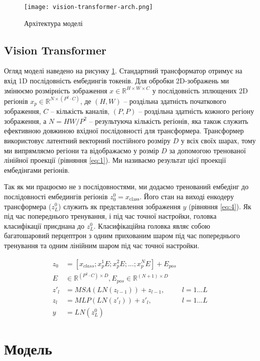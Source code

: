 \begin{figure}[H]
    \centering
    \texttt{[image: vision-transformer-arch.png]}
    \caption{Архітектура моделі}
    \label{fig:model-arch}
\end{figure}

\subsection{Vision Transformer}
Огляд моделі наведено на рисунку \ref{fig:model-arch}.
Стандартний трансформатор отримує на вхід 1D
послідовність ембедингів токенів.
Для обробки 2D-зображень ми змінюємо розмірність зображення
$x \in \mathbb{R}^{H\times W \times C}$ у послідовність
зплющених 2D регіонів $x_p \in \mathbb{R}^{N\times (P^2\cdot C)}$,
де $(H, W)$ -- роздільна здатність початкового
зображення, $C$ -- кількість каналів, $(P, P)$ -- роздільна
здатність кожного регіону зображення,
а $N = HW / P^2$ -- результуюча кількість регіонів,
яка також служить ефективною довжиною вхідної послідовності для
трансформера. Трансформер використовує
латентний векторний постійного розміру $D$ у всіх своїх шарах,
тому ми випрямляємо регіони та відображаємо у розмір $D$
за допомогою тренованої лінійної проекції (рівняння \ref{eq:1}).
Ми називаємо результат цієї проекції ембедінгами регіонів.

Так як ми працюємо не з послідовностями, ми додаємо
тренований ембедінг до послідовності ембедингів регіонів
$z_0^0 = x_{\text{class}}$. Його стан на виході енкодеру трансформера
($z_L^0$) служить як представлення зображення $y$ (рівняння \ref{eq:4}).
Як під час попереднього тренування, і під час точної настройки,
головка класифікації приєднана до  $z^0_L$.
Класифікаційна головка являє собою багатошаровий перцептрон
з одним прихованим
шаром під час попереднього тренування та одним лінійним шаром
під час точної настройки.

\begin{align}
    z_0 &= [x_{{class}};x_p^1 E;x_p^2 E; ...; x_p^N E] +E_{pos} \label{eq:1}\\
    E &\in \mathbb{R}^{(P^2 \cdot C)\times D},
    E_{pos} \in \mathbb{R}^{(N+1)\times D} \nonumber\\
    z'_l &= {MSA}({LN}(z_{l-1})) + z_{l-1}, &l=1...L \label{eq:2}\\
    z_l &= {MLP}({LN(z'_l)})+z'_l, &l=1...L \label{eq:3}\\
    y &= {LN}(z_L^0) \label{eq:4}
\end{align}

\section{Модель}
